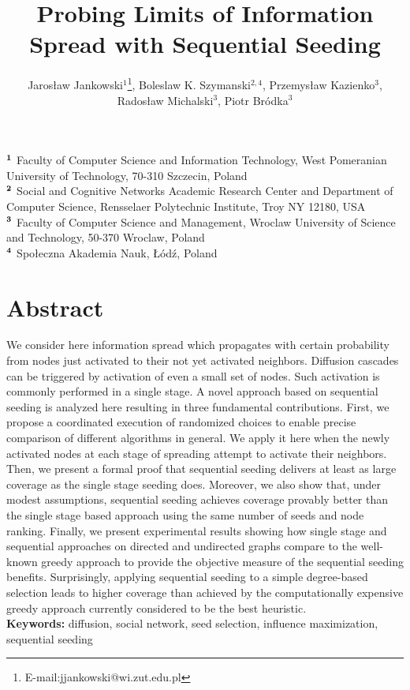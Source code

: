 \documentclass[11pt]{article} %
\title{Probing Limits of Information Spread with Sequential Seeding}
\author{Jarosław Jankowski$^{1}$\footnote{E-mail:jjankowski@wi.zut.edu.pl}, Boleslaw K. Szymanski$^{2,4}$, Przemys{\l}aw Kazienko$^{3}$, \\ Rados{\l}aw Michalski$^{3}$, Piotr Bródka$^{3}$}
\date{}
\begin{document}
\maketitle

\begin{flushleft}
$^{\bf{1}}$ Faculty of Computer Science and Information Technology, West Pomeranian University of Technology, 70-310 Szczecin, Poland\\
$^{\bf{2}}$ Social and Cognitive Networks Academic Research Center and Department of Computer Science, Rensselaer Polytechnic Institute, Troy NY 12180, USA\\
$^{\bf{3}}$ Faculty of Computer Science and Management, Wroclaw University of Science and Technology, 50-370 Wroclaw, Poland \\
$^{\bf{4}}$ Spo\l{}eczna Akademia Nauk, \L{}\'{o}d\'{z}, Poland\\
\end{flushleft}

\section*{Abstract} 
We consider here information spread which propagates with certain probability from nodes just activated to their not yet activated neighbors. Diffusion cascades can be triggered by activation of even a small set of nodes. Such activation is commonly performed in a single stage. A novel approach based on sequential seeding is analyzed here resulting in three fundamental contributions. First, we propose a coordinated execution of randomized choices to enable precise comparison of different algorithms in general. We apply it here when the newly activated nodes at each stage of spreading attempt to activate their neighbors. Then, we present a formal proof that sequential seeding delivers at least as large coverage as the single stage seeding does. Moreover, we also show that, under modest assumptions, sequential seeding achieves coverage provably better than the single stage based approach using the same number of seeds and node ranking. Finally, we present experimental results showing how single stage and sequential approaches on directed and undirected graphs compare to the well-known greedy approach to provide the objective measure of the sequential seeding benefits. Surprisingly, applying sequential seeding to a simple degree-based selection leads to higher coverage than achieved by the computationally expensive greedy approach currently considered to be the best heuristic.
\\
\newline
\textbf{Keywords:} diffusion, social network, seed selection, influence maximization, sequential seeding
\\
\end{document}
